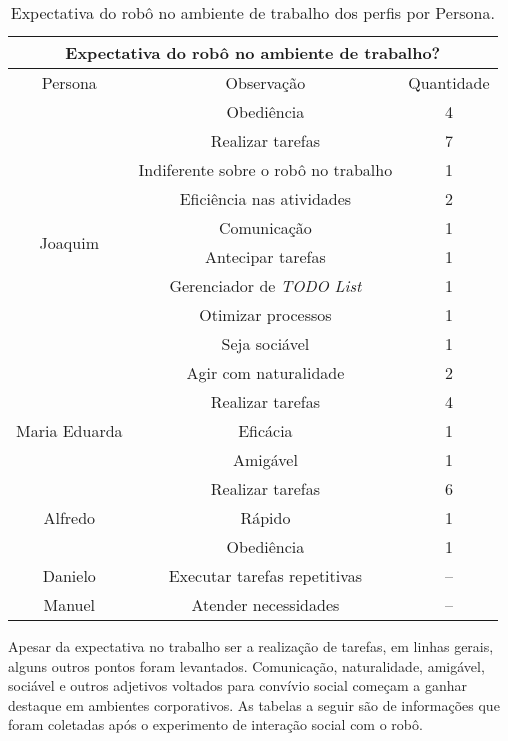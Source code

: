\begin{table}[!ht]
	\caption{Expectativa do robô no ambiente de trabalho dos perfis por Persona.}
	\label{tab:expectativatrabalho}
	\centering
	\begin{tabular}{c | c | c }
        \hline
        \multicolumn{3}{c}{Expectativa do robô no ambiente de trabalho?} \\
        \hline
        Persona & Observação & Quantidade \\
        \hline
        \multirow{10}{*}{Joaquim} & Obediência & 4 \\
        \hhline{~--}
        & Realizar tarefas & 7 \\
        \hhline{~--}
        & Indiferente sobre o robô no trabalho & 1 \\
        \hhline{~--}
        & Eficiência nas atividades & 2 \\
        \hhline{~--}
        & Comunicação & 1 \\
        \hhline{~--}
        & Antecipar tarefas & 1 \\
        \hhline{~--}
        & Gerenciador de \emph{TODO List} & 1 \\
        \hhline{~--}
        & Otimizar processos & 1 \\
        \hhline{~--}
        & Seja sociável & 1 \\
        \hhline{~--}
        & Agir com naturalidade & 2 \\
        \hline
        \multirow{3}{*}{Maria Eduarda} & Realizar tarefas & 4 \\
        \hhline{~--}
        & Eficácia & 1 \\
        \hhline{~--}
        & Amigável & 1 \\
        \hline
        \multirow{3}{*}{Alfredo} & Realizar tarefas & 6 \\
        \hhline{~--}
        & Rápido & 1 \\
        \hhline{~--}
        & Obediência & 1 \\
        \hline
        Danielo & Executar tarefas repetitivas & -- \\
        \hline
        Manuel & Atender necessidades & -- \\
        \hline
    \end{tabular}
\end{table}

Apesar da expectativa no trabalho ser a realização de tarefas, em linhas gerais, alguns outros pontos foram levantados. Comunicação, naturalidade, amigável, sociável e outros adjetivos voltados para convívio social começam a ganhar destaque em ambientes corporativos. As tabelas a seguir são de informações que foram coletadas após o experimento de interação social com o robô.
